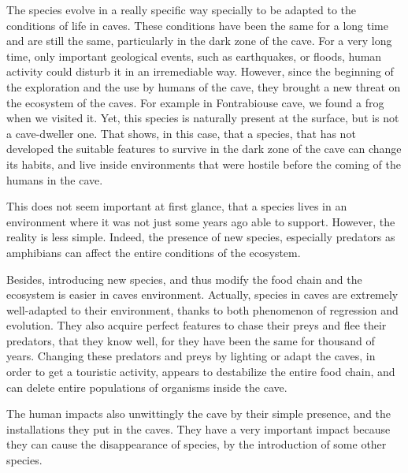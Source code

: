 \documentclass[draft, final]{report}
\begin{document}
The species evolve in a really specific way specially to be adapted to the conditions of life in caves. These conditions have been the same for a long time and are still the same, particularly in the dark zone of the cave. For a very long time, only important geological events, such as earthquakes, or floods, human activity could disturb it in an irremediable way. However, since the beginning of the exploration and the use by humans of the cave, they brought a new threat on the ecosystem of the caves. For example in Fontrabiouse  cave, we found a frog when we visited it. Yet, this species is naturally present at the surface, but is not a cave-dweller one. That shows, in this case, that a species, that has not developed the suitable features to survive in the dark zone of the cave can change its habits, and live inside environments that were hostile before the coming of the humans in the cave.\\
\par
This does not seem important at first glance, that a species lives in an environment where it was not just some years ago able to support. However, the reality is less simple. Indeed, the presence of new species, especially predators as amphibians can affect the entire conditions of the ecosystem.\\
\par
Besides, introducing new species, and thus modify the food chain and the ecosystem is easier in caves environment. Actually, species in caves are extremely well-adapted to their environment, thanks to both phenomenon of regression and evolution. They also acquire perfect features to chase their preys and flee their predators, that they know well, for they have been the same for thousand of years. Changing these predators and preys by lighting or adapt the caves, in order to get a touristic activity, appears to destabilize the entire food chain, and can delete entire populations of organisms inside the cave.\\
\par
The human impacts also unwittingly the cave by their simple presence, and the installations they put in the caves. They have a very important impact because they can cause the disappearance of species, by the introduction of some other species.\\
\end{document}
